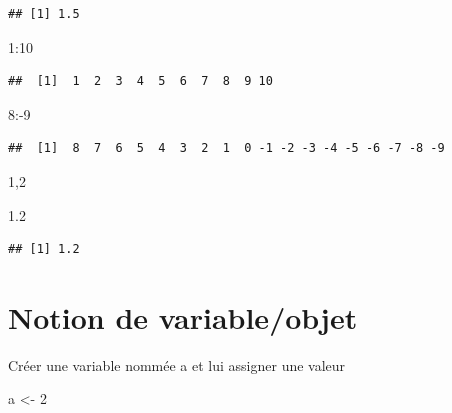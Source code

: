\documentclass[
]{book}
\newenvironment{Shaded}{\begin{snugshade}}{\end{snugshade}}
\newcommand{\DecValTok}[1]{\textcolor[rgb]{0.00,0.00,0.81}{#1}}
\newcommand{\FloatTok}[1]{\textcolor[rgb]{0.00,0.00,0.81}{#1}}
\newcommand{\NormalTok}[1]{#1}
\newcommand{\OtherTok}[1]{\textcolor[rgb]{0.56,0.35,0.01}{#1}}
\newcommand{\SpecialCharTok}[1]{\textcolor[rgb]{0.00,0.00,0.00}{#1}}
\begin{document}
\begin{verbatim}
## [1] 1.5
\end{verbatim}

\begin{Shaded}
\begin{Highlighting}[]
\DecValTok{1}\SpecialCharTok{:}\DecValTok{10}
\end{Highlighting}
\end{Shaded}

\begin{verbatim}
##  [1]  1  2  3  4  5  6  7  8  9 10
\end{verbatim}

\begin{Shaded}
\begin{Highlighting}[]
\DecValTok{8}\SpecialCharTok{:{-}}\DecValTok{9}
\end{Highlighting}
\end{Shaded}

\begin{verbatim}
##  [1]  8  7  6  5  4  3  2  1  0 -1 -2 -3 -4 -5 -6 -7 -8 -9
\end{verbatim}

\begin{Shaded}
\begin{Highlighting}[]
\DecValTok{1}\NormalTok{,}\DecValTok{2}
\end{Highlighting}
\end{Shaded}

\begin{Shaded}
\begin{Highlighting}[]
\FloatTok{1.2}
\end{Highlighting}
\end{Shaded}

\begin{verbatim}
## [1] 1.2
\end{verbatim}

\hypertarget{notion-de-variableobjet}{%
\section{Notion de variable/objet}\label{notion-de-variableobjet}}

Créer une variable nommée a et lui assigner une valeur

\begin{Shaded}
\begin{Highlighting}[]
\NormalTok{a }\OtherTok{\textless{}{-}} \DecValTok{2}
\end{Highlighting}
\end{Shaded}
\end{document}
